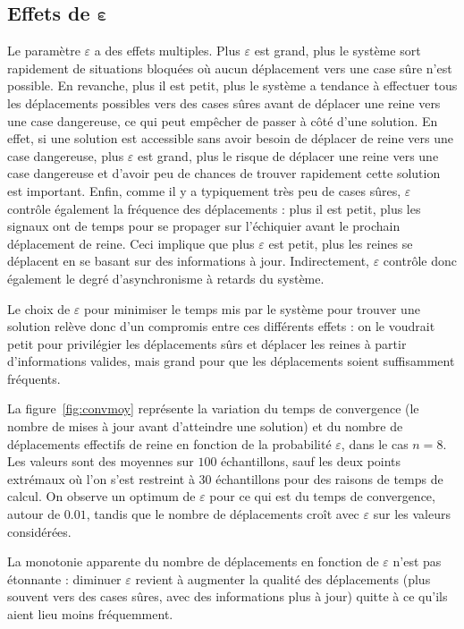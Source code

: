 \subsection{Effets de $\boldsymbol \varepsilon$}



Le paramètre $\varepsilon$ a des effets multiples. Plus $\varepsilon$ est grand, plus le système sort rapidement de situations bloquées où aucun déplacement vers une case sûre n'est possible. En revanche, plus il est petit, plus le système a tendance à effectuer tous les déplacements possibles vers des cases sûres avant de déplacer une reine vers une case dangereuse, ce qui peut empêcher de passer à côté d'une solution. En effet, si une solution est accessible sans avoir besoin de déplacer de reine vers une case dangereuse, plus $\varepsilon$ est grand, plus le risque de déplacer une reine vers une case dangereuse et d'avoir peu de chances de trouver rapidement cette solution est important. Enfin, comme il y a typiquement très peu de cases sûres, $\varepsilon$ contrôle également la fréquence des déplacements : plus il est petit, plus les signaux ont de temps pour se propager sur l'échiquier avant le prochain déplacement de reine. Ceci implique que plus $\varepsilon$ est petit, plus les reines se déplacent en se basant sur des informations à jour. Indirectement, $\varepsilon$ contrôle donc également le degré d'asynchronisme à retards du système. 

Le choix de $\varepsilon$ pour minimiser le temps mis par le système pour trouver une solution relève donc d'un compromis entre ces différents effets : on le voudrait petit pour privilégier les déplacements sûrs et déplacer les reines à partir d'informations valides, mais grand pour que les déplacements soient suffisamment fréquents.

La figure~\ref{fig:convmoy} représente la variation du temps de convergence (le nombre de mises à jour avant d'atteindre une solution) et du nombre de déplacements effectifs de reine en fonction de la probabilité $\varepsilon$, dans le cas $n=8$. Les valeurs sont des moyennes sur $100$ échantillons, sauf les deux points extrémaux où l'on s'est restreint à $30$ échantillons pour des raisons de temps de calcul. On observe un optimum de $\varepsilon$ pour ce qui est du temps de convergence, autour de $0.01$, tandis que le nombre de déplacements croît avec $\varepsilon$ sur les valeurs considérées. 

La monotonie apparente du nombre de déplacements en fonction de $\varepsilon$ n'est pas étonnante : diminuer $\varepsilon$ revient à augmenter la qualité des déplace\-ments (plus souvent vers des cases sûres, avec des informations plus à jour) quitte à ce qu'ils aient lieu moins fréquemment.

